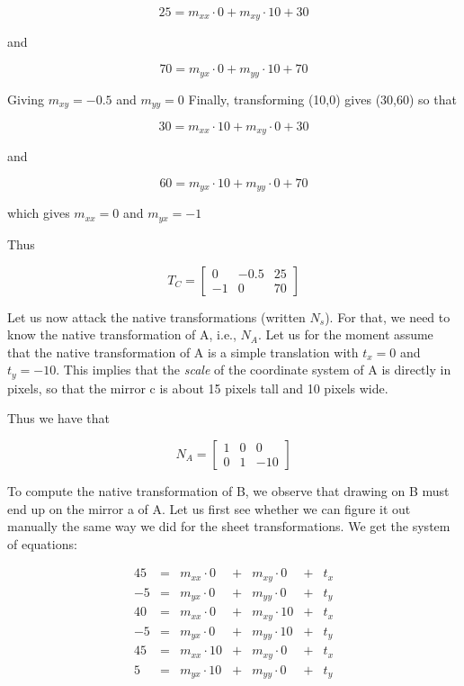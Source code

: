 $$25 = m_{xx} \cdot 0 + m_{xy} \cdot 10 + 30$$

and 

$$70 = m_{yx} \cdot 0 + m_{yy} \cdot 10 + 70$$

Giving $m_{xy} = -0.5$ and $m_{yy} = 0$
Finally, transforming (10,0) gives (30,60) so that

$$30 = m_{xx} \cdot 10 + m_{xy} \cdot 0 + 30$$

and

$$60 = m_{yx} \cdot 10 + m_{yy} \cdot 0 + 70$$

which gives $m_{xx} = 0$ and $m_{yx} = -1$

Thus

\[ T_C = \left[ \begin{array}{ccc}
0 & -0.5 & 25\\
-1 & 0 & 70 
\end{array} \right] \]

Let us now attack the native transformations (written $N_s$).  For
that, we need to know the native transformation of A, i.e., $N_A$.
Let us for the moment assume that the native transformation of A is a
simple translation with $t_x = 0$ and $t_y = -10$.  This implies that
the \emph{scale} of the coordinate system of A is directly in pixels,
so that the mirror c is about 15 pixels tall and 10 pixels wide.

Thus we have that 

\[ N_A = \left[ \begin{array}{ccc}
1 & 0 & 0\\
0 & 1 & -10 
\end{array} \right] \]

To compute the native transformation of B, we observe that drawing on
B must end up on the mirror a of A.  Let us first see whether we can
figure it out manually the same way we did for the sheet
transformations.  We get the system of equations:

\[ \begin{array}{ccccccc}
45 & = & m_{xx} \cdot 0 & + & m_{xy} \cdot 0 & + & t_x \\
-5 & = & m_{yx} \cdot 0 & + & m_{yy} \cdot 0 & + & t_y \\
40 & = & m_{xx} \cdot 0 & + & m_{xy} \cdot 10 & + & t_x \\
-5 & = & m_{yx} \cdot 0 & + & m_{yy} \cdot 10 & + & t_y \\
45 & = & m_{xx} \cdot 10 & + & m_{xy} \cdot 0 & + & t_x \\
5 & = & m_{yx} \cdot 10 & + & m_{yy} \cdot 0 & + & t_y \\
\end{array} \]

